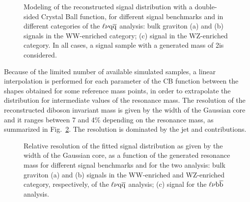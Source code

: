 \begin{figure}[!htb]
\centering
{}
\caption{Modeling of the reconstructed signal distribution with a double-sided Crystal Ball function, for different signal benchmarks and in different \mJ categories of the $\ell\nu\mathrm{q}\overline{\mathrm{q}}$ analysis: 
bulk graviton (a) and \Zpr (b) signals in the WW-enriched category; (c) \Wpr signal in the WZ-enriched category. In all cases, a signal sample with a generated mass of 2\TeV is considered.}
\label{fig:mWVfit-signal-13TeV}
\end{figure}

Because of the limited number of available simulated samples, a linear interpolation is performed for each parameter of the CB function between
the shapes obtained for some reference mass points, in order to extrapolate the distribution for intermediate values of the resonance mass.
The resolution of the reconstructed diboson invariant mass is given by the width of the Gaussian core and it ranges between 7 and 4\% depending on the resonance mass, as summarized in Fig.~\ref{fig:relCB}.
The resolution is dominated by the jet and \ETmiss contributions.

\begin{figure}[!htb]
\centering
{}
\caption{Relative resolution of the fitted signal distribution as given by the width of the Gaussian core, as a function of the generated resonance mass for different signal benchmarks and for the two analysis:
bulk graviton (a) and \Wpr (b) signals in the WW-enriched and WZ-enriched category, respectively, of the $\ell\nu\mathrm{q}\overline{\mathrm{q}}$ analysis; (c) \Wpr signal for the $\ell\nu{\mathrm{b}\overline{\mathrm{b}}}$ analysis.}
\label{fig:relCB}
\end{figure}

